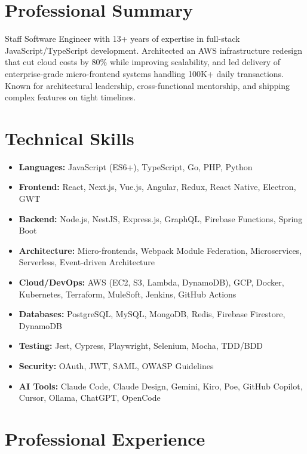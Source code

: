 \documentclass[10pt,a4paper]{article}
\begin{document}
\thispagestyle{fancy}

\section*{Professional Summary}
Staff Software Engineer with 13+ years of expertise in full-stack JavaScript/TypeScript development. Architected an AWS infrastructure redesign that cut cloud costs by 80\% while improving scalability, and led delivery of enterprise-grade micro-frontend systems handling 100K+ daily transactions. Known for architectural leadership, cross-functional mentorship, and shipping complex features on tight timelines.

\section*{Technical Skills}
\begin{itemize}[leftmargin=*, nosep]
  \item \textbf{Languages:} JavaScript (ES6+), TypeScript, Go, PHP, Python
  \item \textbf{Frontend:} React, Next.js, Vue.js, Angular, Redux, React Native, Electron, GWT
  \item \textbf{Backend:} Node.js, NestJS, Express.js, GraphQL, Firebase Functions, Spring Boot
  \item \textbf{Architecture:} Micro-frontends, Webpack Module Federation, Microservices, Serverless, Event-driven Architecture
  \item \textbf{Cloud/DevOps:} AWS (EC2, S3, Lambda, DynamoDB), GCP, Docker, Kubernetes, Terraform, MuleSoft, Jenkins, GitHub Actions
  \item \textbf{Databases:} PostgreSQL, MySQL, MongoDB, Redis, Firebase Firestore, DynamoDB
  \item \textbf{Testing:} Jest, Cypress, Playwright, Selenium, Mocha, TDD/BDD
  \item \textbf{Security:} OAuth, JWT, SAML, OWASP Guidelines
  \item \textbf{AI Tools:} Claude Code, Claude Design, Gemini, Kiro, Poe, GitHub Copilot, Cursor, Ollama, ChatGPT, OpenCode
\end{itemize}

\section*{Professional Experience}
\end{document}
